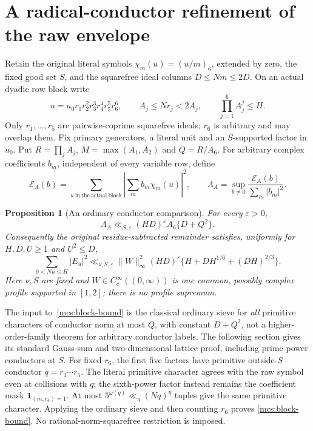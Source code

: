 \documentclass[11pt,oneside,openany]{book}
\newtheorem{proposition}[theorem]{Proposition}
\theoremstyle{definition}\newtheorem{definition}[theorem]{Definition}
\theoremstyle{remark}\newtheorem{remark}[theorem]{Remark}
\begin{document}
\section{A radical-conductor refinement of the raw envelope}\label{mcs:core}
Retain the original literal symbols $\chi_m(u)=(u/m)_6$, extended by zero,
the fixed good set $S$, and the squarefree ideal columns $D\le Nm\le2D$.
On an actual dyadic row block write
\[
 u=u_0r_1r_2^2r_3^3r_4^4r_5^5r_6^6,\qquad
 A_j\le Nr_j<2A_j,\qquad \prod_{j=1}^6A_j^j\le H.
\]
Only $r_1,\ldots,r_5$ are pairwise-coprime squarefree ideals;
$r_6$ is arbitrary and may overlap them. Fix primary generators,
a literal unit and an $S$-supported factor in $u_0$. Put
$R=\prod_jA_j$, $M=\max(A_1,A_2)$ and $Q=R/A_6$.
For arbitrary complex coefficients $b_m$, independent of every variable row,
define
\[
 \mathcal E_A(b)=\sum_{u\ \mathrm{in\ the\ actual\ block}}
       \left|\sum_m b_m\chi_m(u)\right|^2,
 \qquad \Lambda_A=\sup_{b\ne0}\frac{\mathcal E_A(b)}{\sum_m|b_m|^2}.
\]
\begin{proposition}[An ordinary conductor comparison]\label{mcs:block}
For every $\varepsilon>0$,
\begin{equation}\label{mcs:block-bound}
 \Lambda_A\ll_{S,\varepsilon}(HD)^\varepsilon
             A_6\{D+Q^2\}.
\end{equation}
Consequently the original residue-subtracted remainder satisfies,
uniformly for $H,D,U\ge1$ and $U^2\le D$,
\begin{equation}\label{mcs:uniform}
 \sum_{0<Nu\le H}|E_u|^2
 \ll_{\nu,S,\varepsilon}\|W\|_\infty^2(HD)^\varepsilon
       \{H+DH^{1/6}+(DH)^{2/3}\}.
\end{equation}
Here $\nu,S$ are fixed and $W\in C_c^\infty((0,\infty))$ is one common,
possibly complex profile supported in $[1,2]$; there is no profile supremum.
\end{proposition}
The input to~\eqref{mcs:block-bound} is the classical ordinary sieve for
\emph{all} primitive characters of conductor norm at most $Q$, with constant
$D+Q^2$, not a higher-order-family theorem for arbitrary conductor labels.
The following section gives its standard Gauss-sum and two-dimensional
lattice proof, including prime-power conductors at $S$.
For fixed $r_6$, the first five factors have primitive outside-$S$
conductor $q=r_1\cdots r_5$. The literal primitive character agrees with
the raw symbol even at collisions with $q$; the sixth-power factor instead
remains the coefficient mask $\mathbf1_{(m,r_6)=1}$.
At most $5^{\omega(q)}\ll_\eta(Nq)^\eta$ tuples give the same primitive
character. Applying the ordinary sieve and then counting $r_6$ proves
\eqref{mcs:block-bound}. No rational-norm-squarefree restriction is imposed.
\end{document}
